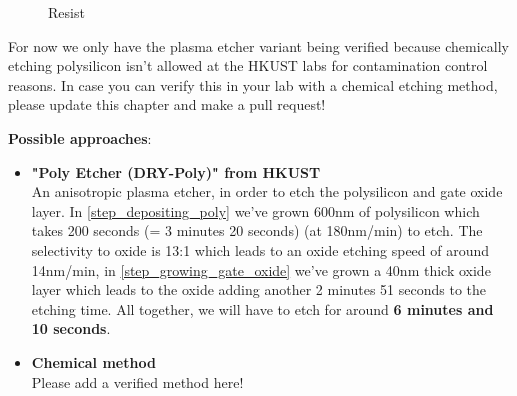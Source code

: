 \begin{figure}[H]
	\centering
	\begin{tikzpicture}[node distance = 3cm, auto, thick,scale=\CrossAndTopSection, every node/.style={transform shape}]
		
	\end{tikzpicture}
	\begin{tikzpicture}[node distance = 3cm, auto, thick,scale=\CrossAndTopSection, every node/.style={transform shape}]
		
	\end{tikzpicture}
	\drawStepArrow{}
	\begin{tikzpicture}[node distance = 3cm, auto, thick,scale=\CrossAndTopSection, every node/.style={transform shape}]
		
	\end{tikzpicture}
	\begin{tikzpicture}[node distance = 3cm, auto, thick,scale=\CrossAndTopSection, every node/.style={transform shape}]
		
	\end{tikzpicture}
	\caption{Resist}
\end{figure}

\begin{mdframed}[linewidth=2pt,linecolor=red]
For now we only have the plasma etcher variant being verified because chemically etching polysilicon isn't allowed at the HKUST labs for contamination control reasons.
In case you can verify this in your lab with a chemical etching method, please update this chapter and make a pull request!
\end{mdframed}

\textbf{Possible approaches}:
\begin{itemize}
	\item \textbf{"Poly Etcher (DRY-Poly)" from HKUST} \\
	An anisotropic plasma etcher, in order to etch the polysilicon and gate oxide layer.
	In \autoref{step_depositing_poly} we've grown 600nm of polysilicon which takes 200 seconds (= 3 minutes 20 seconds) (at 180nm/min) to etch.
	The selectivity to oxide is 13:1 which leads to an oxide etching speed of around 14nm/min, in \autoref{step_growing_gate_oxide} we've grown a 40nm thick oxide layer which leads to the oxide adding another 2 minutes 51 seconds to the etching time.
	All together, we will have to etch for around \textbf{6 minutes and 10 seconds}.
	\item \textbf{Chemical method} \\
	Please add a verified method here!
\end{itemize}


